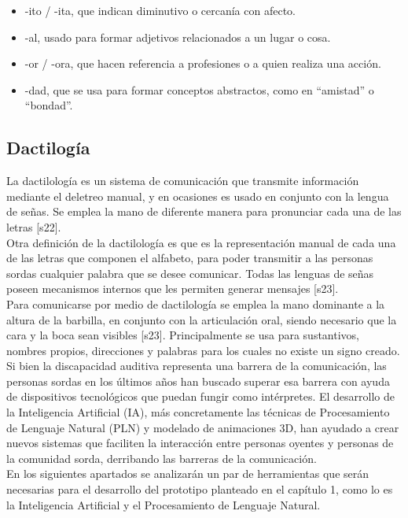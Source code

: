 \begin{itemize}
    \item -ito / -ita, que indican diminutivo o cercanía con afecto.
    \item -al, usado para formar adjetivos relacionados a un lugar o cosa.
    \item -or / -ora, que hacen referencia a profesiones o a quien realiza una acción.
    \item -dad, que se usa para formar conceptos abstractos, como en “amistad” o “bondad”.
\end{itemize}

\subsection{Dactilogía}
La dactilología es un sistema de comunicación que transmite información mediante el deletreo manual, y en ocasiones es usado en conjunto con la lengua de señas. Se emplea la mano de diferente manera para pronunciar cada una de las letras [s22].\\

Otra definición de la dactilología es que es la representación manual de cada una de las letras que componen el alfabeto, para poder transmitir a las personas sordas cualquier palabra que se desee comunicar. Todas las lenguas de señas poseen mecanismos internos que les permiten generar mensajes [s23].\\

Para comunicarse por medio de dactilología se emplea la mano dominante a la altura de la barbilla, en conjunto con la articulación oral, siendo necesario que la cara y la boca sean visibles [s23]. Principalmente se usa para sustantivos, nombres propios, direcciones y palabras para los cuales no existe un signo creado.\\

Si bien la discapacidad auditiva representa una barrera de la comunicación, las personas sordas en los últimos años han buscado superar esa barrera con ayuda de dispositivos tecnológicos que puedan fungir como intérpretes. El desarrollo de la Inteligencia Artificial (IA), más concretamente las técnicas de Procesamiento de Lenguaje Natural (PLN) y modelado de animaciones 3D, han ayudado a crear nuevos sistemas que faciliten la interacción entre personas oyentes y personas de la comunidad sorda, derribando las barreras de la comunicación.\\

En los siguientes apartados se analizarán un par de herramientas que serán necesarias para el desarrollo del prototipo planteado en el capítulo 1, como lo es la Inteligencia Artificial y el Procesamiento de Lenguaje Natural.\\

